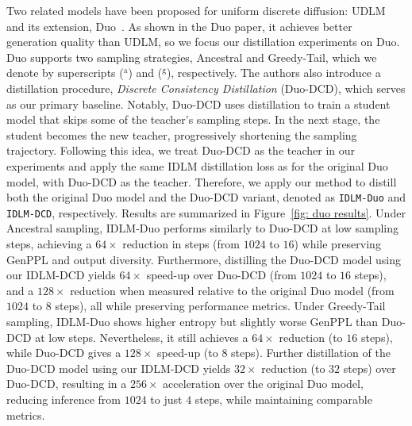   Two related models have been proposed for uniform discrete diffusion: UDLM~\citep{schiff2024discreteguidance} and its extension, Duo~\citep{sahoo2025the}. As shown in the Duo paper, it achieves better generation quality than UDLM, so we focus our distillation experiments on Duo. Duo supports two sampling strategies, Ancestral and Greedy-Tail, which we denote by superscripts ($^{\mathrm{a}}$) and ($^{\mathrm{g}}$), respectively. The authors also introduce a distillation procedure, \textit{Discrete Consistency Distillation} (Duo-DCD), which serves as our primary baseline. Notably, Duo-DCD uses distillation to train a student model that skips some of the teacher's sampling steps. In the next stage, the student becomes the new teacher, progressively shortening the sampling trajectory. Following this idea, we treat Duo-DCD as the teacher in our experiments and apply the same IDLM distillation loss as for the original Duo model, with Duo-DCD as the teacher. Therefore, we apply our method to distill both the original Duo model and the Duo-DCD variant, denoted as \texttt{IDLM-Duo} and \texttt{IDLM-DCD}, respectively. Results are summarized in Figure~\ref{fig: duo results}. Under Ancestral sampling, IDLM-Duo performs similarly to Duo-DCD at low sampling steps, achieving a $64\times$ reduction in steps (from $1024$ to $16$) while preserving GenPPL and output diversity.
  Furthermore, distilling the Duo-DCD model using our IDLM-DCD yields $64\times$ speed-up over Duo-DCD (from $1024$ to $16$ steps), and a $128\times$ reduction when measured relative to the original Duo model (from $1024$ to $8$ steps), all while preserving performance metrics. 
  Under Greedy-Tail sampling, IDLM-Duo shows higher entropy but slightly worse GenPPL than Duo-DCD at low steps. Nevertheless, it still achieves a $64\times$ reduction (to $16$ steps), while Duo-DCD gives a $128\times$ speed-up (to $8$ steps).
  Further distillation of the Duo-DCD model using our IDLM-DCD yields $32\times$ reduction (to $32$ steps) over Duo-DCD, resulting in a $256\times$ acceleration over the original Duo model, reducing inference from $1024$ to just $4$ steps, while maintaining comparable metrics.
        
    
